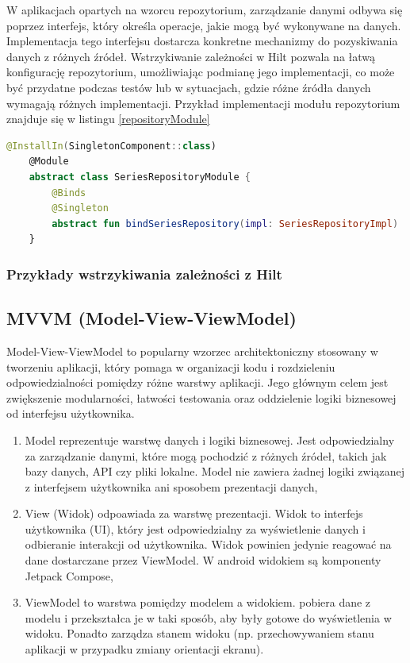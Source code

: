\documentclass[12pt,twoside]{article}
\begin{document}
W aplikacjach opartych na wzorcu repozytorium, zarządzanie danymi odbywa się poprzez interfejs, który określa 
operacje, jakie mogą być wykonywane na danych. Implementacja tego interfejsu dostarcza konkretne mechanizmy do 
pozyskiwania danych z różnych źródeł. Wstrzykiwanie zależności w Hilt pozwala na łatwą konfigurację repozytorium, 
umożliwiając podmianę jego implementacji, co może być przydatne podczas testów lub w sytuacjach, gdzie różne źródła 
danych wymagają różnych implementacji. Przykład implementacji modułu repozytorium znajduje się w listingu 
\ref{repositoryModule}

\begin{lstlisting}[language=Kotlin,caption=Przykład modułu repozytorium SeriesRepository, label={repositoryModule}]
	@InstallIn(SingletonComponent::class)
	@Module
	abstract class SeriesRepositoryModule {
		@Binds
		@Singleton
		abstract fun bindSeriesRepository(impl: SeriesRepositoryImpl) : SeriesRepository
	}
\end{lstlisting}

\subsubsection{Przykłady wstrzykiwania zależności z Hilt}

\subsection{MVVM (Model-View-ViewModel)}

Model-View-ViewModel to popularny wzorzec architektoniczny stosowany w tworzeniu aplikacji, który pomaga w 
organizacji kodu i rozdzieleniu odpowiedzialności pomiędzy różne warstwy aplikacji. Jego głównym celem
jest zwiększenie modularności, łatwości testowania oraz oddzielenie logiki biznesowej od interfejsu użytkownika.

\begin{enumerate}[label=\alph*), leftmargin=1.25cm]
	\item Model reprezentuje warstwę danych i logiki biznesowej. Jest odpowiedzialny za zarządzanie danymi,
	które mogą pochodzić z różnych źródeł, takich jak bazy danych, API czy pliki lokalne. Model nie zawiera
	żadnej logiki związanej z interfejsem użytkownika ani sposobem prezentacji danych,
	\item View (Widok) odpoawiada za warstwę prezentacji. Widok to interfejs użytkownika (UI), który jest
	odpowiedzialny za wyświetlenie danych i odbieranie interakcji od użytkownika. Widok powinien jedynie
	reagować na dane dostarczane przez ViewModel. W android widokiem są komponenty Jetpack Compose,
	\item ViewModel to warstwa pomiędzy modelem a widokiem. pobiera dane z modelu i przekształca je
	w taki sposób, aby były gotowe do wyświetlenia w widoku. Ponadto zarządza stanem widoku (np. przechowywaniem
	stanu aplikacji w przypadku zmiany orientacji ekranu).
\end{enumerate}
\end{document}
